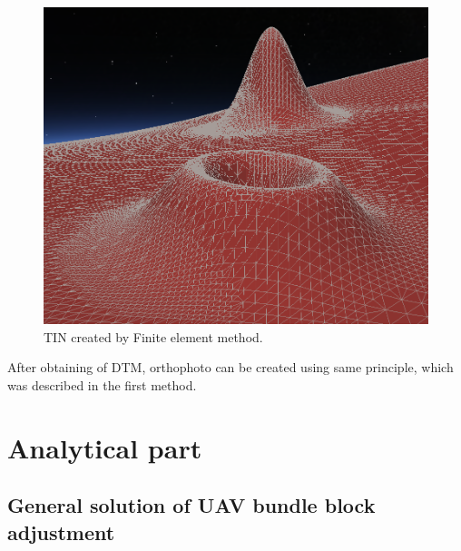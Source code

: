 \documentclass[a4paper,12pt]{article}
\begin{document}
\begin{figure}[h]
    \centering
    \includegraphics[scale=0.2]{figures/finite_elements.png}
    \caption{TIN created by Finite element method.}
    \label{fig:rel_or_amb}
\end{figure}

After obtaining of DTM, orthophoto can be created using same principle, which was described in the first method. 


\section{Analytical part}

\subsection{General solution of UAV bundle block adjustment}


\end{document}
